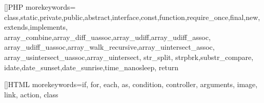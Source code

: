 []{PHP} {
    morekeywords={
        class,static,private,public,abstract,interface,const,function,require_once,final,new,extends,implements,
        array_combine,array_diff_uassoc,array_udiff,array_udiff_assoc,
        array_udiff_uassoc,array_walk_recursive,array_uintersect_assoc,
        array_usintersect_uassoc,array_uintersect,
        str_split, strpbrk,substr_compare,
        idate,date_sunset,date_sunrise,time_nanosleep,
        return
    }
}

[]{HTML} {
    morekeywords={if, for, each, as, condition, controller, arguments, image, link, action, class}
}

\usepackage[final]{pdfpages}

\usepackage{ragged2e}
\usepackage{lscape}

\usepackage{ifthen}
\usepackage{forloop}
\usepackage{todonotes}
\usepackage{xspace}
\usepackage{datatool}
